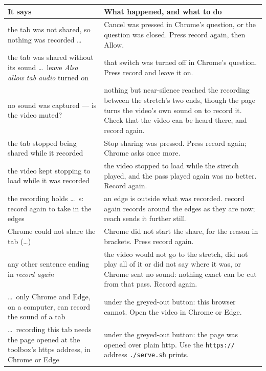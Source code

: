 \documentclass[11pt,oneside]{report}
\newcommand{\file}[1]{\texttt{#1}}
\newcommand{\menu}[1]{\textsf{#1}}
\begin{document}
\begin{center}
\begin{tabular}{@{}p{}p{}@{}}
\toprule
\textsf{It says} & \textsf{What happened, and what to do} \\
\midrule
the tab was not shared, so nothing was recorded \ldots & \menu{Cancel} was
  pressed in Chrome's question, or the question was closed. Press
  \menu{record} again, then \menu{Allow}. \\
\addlinespace
the tab was shared without its sound \ldots\ leave \emph{Also allow tab
  audio} turned on & that switch was turned off in Chrome's question.
  Press \menu{record} and leave it on. \\
\addlinespace
no sound was captured --- is the video muted? & nothing but near-silence
  reached the recording between the stretch's two ends, though the page
  turns the video's own sound on to record it. Check that the video can be
  heard there, and record again. \\
\addlinespace
the tab stopped being shared while it recorded & \menu{Stop sharing} was
  pressed. Press \menu{record} again; Chrome asks once more. \\
\addlinespace
the video kept stopping to load while it was recorded & the video stopped
  to load while the stretch played, and the pass played again was no
  better. Record again. \\
\addlinespace
the recording holds \ldots\ s: record again to take in the edges & an edge
  is outside what was recorded. \menu{record again} records around the
  edges as they are now; \menu{reach} sends it further still. \\
\addlinespace
Chrome could not share the tab (\ldots) & Chrome did not start the share,
  for the reason in brackets. Press \menu{record} again. \\
\addlinespace
any other sentence ending in \emph{record again} & the video would not go
  to the stretch, did not play all of it or did not say where it was, or
  Chrome sent no sound: nothing exact can be cut from that pass. Record
  again. \\
\addlinespace
\ldots\ only Chrome and Edge, on a computer, can record the sound of a
  tab & under the greyed-out button: this browser cannot. Open the video in
  Chrome or Edge. \\
\addlinespace
\ldots\ recording this tab needs the page opened at the toolbox's https
  address, in Chrome or Edge & under the greyed-out button: the page was
  opened over plain http. Use the \texttt{https://} address
  \file{./serve.sh} prints. \\
\bottomrule
\end{tabular}
\end{center}
\end{document}
